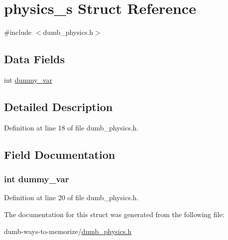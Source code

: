 \hypertarget{structphysics__s}{}\section{physics\+\_\+s Struct Reference}
\label{structphysics__s}


{\ttfamily \#include $<$dumb\+\_\+physics.\+h$>$}

\subsection*{Data Fields}
\begin{DoxyCompactItemize}
\item 
int \hyperlink{structphysics__s_add3cd733345f925ee08431ef2eac23b4}{dummy\+\_\+var}
\end{DoxyCompactItemize}


\subsection{Detailed Description}


Definition at line 18 of file dumb\+\_\+physics.\+h.



\subsection{Field Documentation}
\subsubsection[{\texorpdfstring{dummy\+\_\+var}{dummy_var}}]{\setlength{\rightskip}{0pt plus 5cm}int dummy\+\_\+var}\hypertarget{structphysics__s_add3cd733345f925ee08431ef2eac23b4}{}\label{structphysics__s_add3cd733345f925ee08431ef2eac23b4}


Definition at line 20 of file dumb\+\_\+physics.\+h.



The documentation for this struct was generated from the following file\+:\begin{DoxyCompactItemize}
\item 
dumb-\/ways-\/to-\/memorize/\hyperlink{dumb__physics_8h}{dumb\+\_\+physics.\+h}\end{DoxyCompactItemize}
